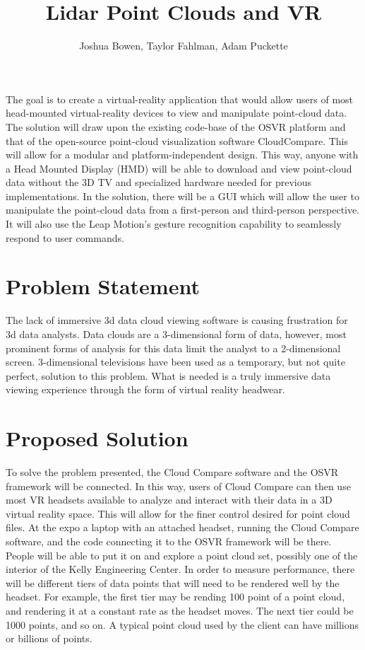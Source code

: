 \documentclass{article}
\begin{document}
\title{Lidar Point Clouds and VR}
\author{Joshua Bowen, Taylor Fahlman, Adam Puckette}

\maketitle

\abstract

The goal is to create a virtual-reality application that would allow users of most head-mounted virtual-reality devices to view and manipulate point-cloud data. The solution will draw upon the existing code-base of the OSVR platform and that of the open-source point-cloud visualization software CloudCompare. This will allow for a modular and platform-independent design. This way, anyone with a Head Mounted Display (HMD) will be able to download and view point-cloud data without the 3D TV and specialized hardware needed for previous implementations. In the solution, there will be a GUI which will allow the user to manipulate the point-cloud data from a first-person and third-person perspective. It will also use the Leap Motion's gesture recognition capability to seamlessly respond to user commands.


\section*{Problem Statement}

The lack of immersive 3d data cloud viewing software is causing frustration for 3d data analysts. Data clouds are a 3-dimensional form of data, however, most prominent forms of analysis for this data limit the analyst to a 2-dimensional screen. 3-dimensional televisions have been used as a temporary, but not quite perfect, solution to this problem. What is needed is a truly immersive data viewing experience through the form of virtual reality headwear.

\section*{Proposed Solution}

To solve the problem presented, the Cloud Compare software and the OSVR framework will be connected. In this way, users of Cloud Compare can then use most VR headsets available to analyze and interact with their data in a 3D virtual reality space. This will allow for the finer control desired for point cloud files. At the expo a laptop with an attached headset, running the Cloud Compare software, and the code connecting it to the OSVR framework will be there. People will be able to put it on and explore a point cloud set, possibly one of the interior of the Kelly Engineering Center. In order to measure performance, there will be different tiers of data points that will need to be rendered well by the headset. For example, the first tier may be rending 100 point of a point cloud, and rendering it at a constant rate as the headset moves. The next tier could be 1000 points, and so on. A typical point cloud used by the client can have millions or billions of points. 
\end{document}
